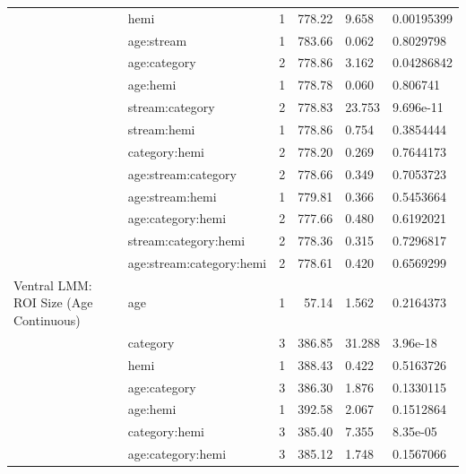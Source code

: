 \begin{table}
\begin{tabular}{llrrll}
\addlinespace
 & hemi & 1 & 778.22 & 9.658 & 0.00195399\\
 & age:stream & 1 & 783.66 & 0.062 & 0.8029798\\
 & age:category & 2 & 778.86 & 3.162 & 0.04286842\\
 & age:hemi & 1 & 778.78 & 0.060 & 0.806741\\
 & stream:category & 2 & 778.83 & 23.753 & 9.696e-11\\
\addlinespace
 & stream:hemi & 1 & 778.86 & 0.754 & 0.3854444\\
 & category:hemi & 2 & 778.20 & 0.269 & 0.7644173\\
 & age:stream:category & 2 & 778.66 & 0.349 & 0.7053723\\
 & age:stream:hemi & 1 & 779.81 & 0.366 & 0.5453664\\
 & age:category:hemi & 2 & 777.66 & 0.480 & 0.6192021\\
\addlinespace
 & stream:category:hemi & 2 & 778.36 & 0.315 & 0.7296817\\
 & age:stream:category:hemi & 2 & 778.61 & 0.420 & 0.6569299\\
Ventral LMM: ROI Size (Age Continuous) & age & 1 & 57.14 & 1.562 & 0.2164373\\
 & category & 3 & 386.85 & 31.288 & 3.96e-18\\
 & hemi & 1 & 388.43 & 0.422 & 0.5163726\\
\addlinespace
 & age:category & 3 & 386.30 & 1.876 & 0.1330115\\
 & age:hemi & 1 & 392.58 & 2.067 & 0.1512864\\
 & category:hemi & 3 & 385.40 & 7.355 & 8.35e-05\\
 & age:category:hemi & 3 & 385.12 & 1.748 & 0.1567066\\
\bottomrule
\end{tabular}
\end{table}
